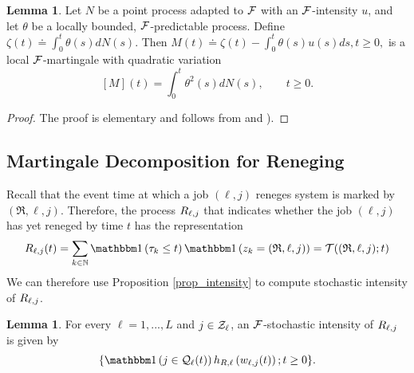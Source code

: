\documentclass{article}
\theoremstyle{definition}
\newtheorem{lemma}[theorem]{Lemma}
\numberwithin{equation}{section}
\begin{document}
\begin{lemma}\label{remark_integral}
Let $N$ be a point process adapted to $\mathcal{F}$ with an $\mathcal{F}$-intensity $u$, and let $\theta$ be a locally bounded, $\mathcal{F}$-predictable process. Define $\zeta(t)\doteq\int_0^t \theta(s)d N(s).$ Then  $M(t)\doteq\zeta(t)-\int_0^t \theta(s) u(s)ds, t\geq 0,$ is a local $\mathcal{F}$-martingale with quadratic variation
\begin{equation}\label{remark_Quad}
  [M](t)=\int_0^t \theta^2(s)d N(s), \quad\quad t\geq0.
\end{equation}
\end{lemma}
\begin{proof}
The proof is elementary and follows from  \cite[Lemma II.L3]{BremaudBook} and \cite[(18.1), Chapter IV]{RogWilbook2}).
\end{proof}


\subsection{Martingale Decomposition for Reneging}
Recall that the event time at which a job $(\ell,j)$ reneges system is marked by $(\mathfrak{R},\ell,j)$. Therefore, the process $R_{\ell,j}$ that indicates whether the job $(\ell,j)$ has yet reneged by time $t$ has the representation
\begin{equation}\label{Rl_marked}
\reneg_{\ell,j}(t)=\sum_{k\in\N}\indic{\tau_k\leq t}\indic{z_k=(\mathfrak{R},\ell,j)}=\mathcal{T}((\mathfrak{R},\ell,j);t)
\end{equation}
We can therefore use Proposition \ref{prop_intensity} to compute stochastic intensity of  $R_{\ell,j}$.

\begin{lemma}\label{lem_Rintensity}
  For every $\ell=1,...,L$ and $j\in\mathcal{Z}_\ell$, an $\mathcal{F}$-stochastic intensity of $R_{\ell,j}$ is given by
  \begin{equation}\label{Rlj_decomposition}
   \{\indic{j\in\inque_\ell(t)} h_{R,\ell}\left(\waiting_{\ell,j}(t)\right);t\geq0\}.
  \end{equation}
\end{lemma}
\end{document}
